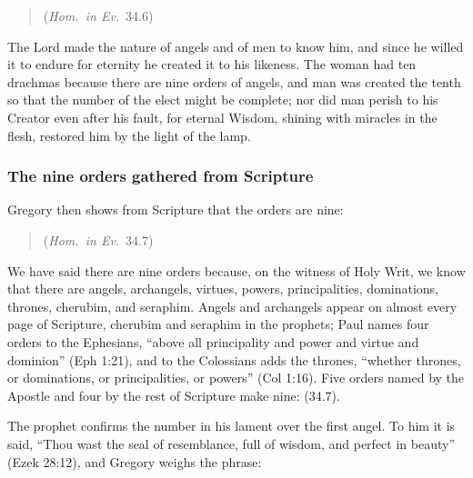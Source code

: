 \begin{quote}
 (\emph{Hom.\ in
Ev.}\ 34.6)
\end{quote}

\noindent The Lord made the nature of angels and of men to know him, and
since he willed it to endure for eternity he created it to his likeness. The
woman had ten drachmas because there are nine orders of angels, and man was
created the tenth so that the number of the elect might be complete; nor did
man perish to his Creator even after his fault, for eternal Wisdom, shining
with miracles in the flesh, restored him by the light of the lamp.

\subsubsection{The nine orders gathered from Scripture}

Gregory then shows from Scripture that the orders are nine:

\begin{quote}
(\emph{Hom.\ in Ev.}\ 34.7)
\end{quote}

\noindent We have said there are nine orders because, on the witness of Holy
Writ, we know that there are angels, archangels, virtues, powers,
principalities, dominations, thrones, cherubim, and seraphim. Angels and
archangels appear on almost every page of Scripture, cherubim and seraphim in
the prophets; Paul names four orders to the Ephesians, ``above all
principality and power and virtue and dominion'' (Eph 1:21), and to the
Colossians adds the thrones, ``whether thrones, or dominations, or
principalities, or powers'' (Col 1:16). Five orders named by the Apostle and
four by the rest of Scripture make nine:  (34.7).

The prophet confirms the number in his lament over the first angel. To him it
is said, ``Thou wast the seal of resemblance, full of wisdom, and perfect in
beauty'' (Ezek 28:12), and Gregory weighs the phrase:

